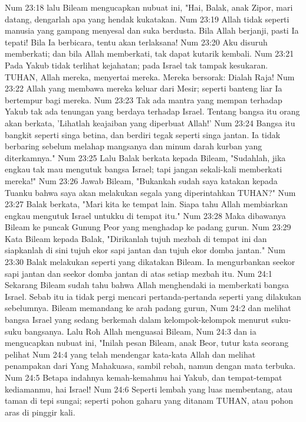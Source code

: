 Num 23:18  lalu Bileam mengucapkan nubuat ini, "Hai, Balak, anak Zipor, mari datang, dengarlah apa yang hendak kukatakan.
Num 23:19  Allah tidak seperti manusia yang gampang menyesal dan suka berdusta. Bila Allah berjanji, pasti Ia tepati! Bila Ia berbicara, tentu akan terlaksana!
Num 23:20  Aku disuruh memberkati; dan bila Allah memberkati, tak dapat kutarik kembali.
Num 23:21  Pada Yakub tidak terlihat kejahatan; pada Israel tak tampak kesukaran. TUHAN, Allah mereka, menyertai mereka. Mereka bersorak: Dialah Raja!
Num 23:22  Allah yang membawa mereka keluar dari Mesir; seperti banteng liar Ia bertempur bagi mereka.
Num 23:23  Tak ada mantra yang mempan terhadap Yakub tak ada tenungan yang berdaya terhadap Israel. Tentang bangsa itu orang akan berkata, 'Lihatlah keajaiban yang diperbuat Allah!'
Num 23:24  Bangsa itu bangkit seperti singa betina, dan berdiri tegak seperti singa jantan. Ia tidak berbaring sebelum melahap mangsanya dan minum darah kurban yang diterkamnya."
Num 23:25  Lalu Balak berkata kepada Bileam, "Sudahlah, jika engkau tak mau mengutuk bangsa Israel; tapi jangan sekali-kali memberkati mereka!"
Num 23:26  Jawab Bileam, "Bukankah sudah saya katakan kepada Tuanku bahwa saya akan melakukan segala yang diperintahkan TUHAN?"
Num 23:27  Balak berkata, "Mari kita ke tempat lain. Siapa tahu Allah membiarkan engkau mengutuk Israel untukku di tempat itu."
Num 23:28  Maka dibawanya Bileam ke puncak Gunung Peor yang menghadap ke padang gurun.
Num 23:29  Kata Bileam kepada Balak, "Dirikanlah tujuh mezbah di tempat ini dan siapkanlah di sini tujuh ekor sapi jantan dan tujuh ekor domba jantan."
Num 23:30  Balak melakukan seperti yang dikatakan Bileam. Ia mengurbankan seekor sapi jantan dan seekor domba jantan di atas setiap mezbah itu.
Num 24:1  Sekarang Bileam sudah tahu bahwa Allah menghendaki ia memberkati bangsa Israel. Sebab itu ia tidak pergi mencari pertanda-pertanda seperti yang dilakukan sebelumnya. Bileam memandang ke arah padang gurun,
Num 24:2  dan melihat bangsa Israel yang sedang berkemah dalam kelompok-kelompok menurut suku-suku bangsanya. Lalu Roh Allah menguasai Bileam,
Num 24:3  dan ia mengucapkan nubuat ini, "Inilah pesan Bileam, anak Beor, tutur kata seorang pelihat
Num 24:4  yang telah mendengar kata-kata Allah dan melihat penampakan dari Yang Mahakuasa, sambil rebah, namun dengan mata terbuka.
Num 24:5  Betapa indahnya kemah-kemahmu hai Yakub, dan tempat-tempat kediamanmu, hai Israel!
Num 24:6  Seperti lembah yang luas membentang, atau taman di tepi sungai; seperti pohon gaharu yang ditanam TUHAN, atau pohon aras di pinggir kali.
